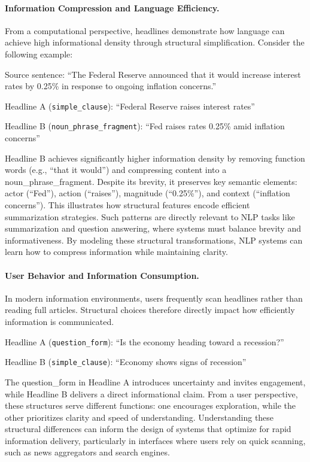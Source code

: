 \documentclass[11pt]{article}
\begin{document}
\paragraph{Information Compression and Language Efficiency.}
From a computational perspective, headlines demonstrate how language can achieve high informational density through structural simplification. Consider the following example:

Source sentence:
``The Federal Reserve announced that it would increase interest rates by 0.25\% in response to ongoing inflation concerns.''

Headline A (\texttt{simple\_clause}):
``Federal Reserve raises interest rates''

Headline B (\texttt{noun\_phrase\_fragment}):
``Fed raises rates 0.25\% amid inflation concerns''

Headline B achieves significantly higher information density by removing function words (e.g., ``that it would'') and compressing content into a noun\_phrase\_fragment. Despite its brevity, it preserves key semantic elements: actor (``Fed''), action (``raises''), magnitude (``0.25\%''), and context (``inflation concerns'').
This illustrates how structural features encode efficient summarization strategies. Such patterns are directly relevant to NLP tasks like summarization and question answering, where systems must balance brevity and informativeness. By modeling these structural transformations, NLP systems can learn how to compress information while maintaining clarity.

\paragraph{User Behavior and Information Consumption.}
In modern information environments, users frequently scan headlines rather than reading full articles. Structural choices therefore directly impact how efficiently information is communicated.

Headline A (\texttt{question\_form}):
``Is the economy heading toward a recession?''

Headline B (\texttt{simple\_clause}):
``Economy shows signs of recession''

The question\_form in Headline A introduces uncertainty and invites engagement, while Headline B delivers a direct informational claim. From a user perspective, these structures serve different functions: one encourages exploration, while the other prioritizes clarity and speed of understanding.
Understanding these structural differences can inform the design of systems that optimize for rapid information delivery, particularly in interfaces where users rely on quick scanning, such as news aggregators and search engines.
\end{document}
